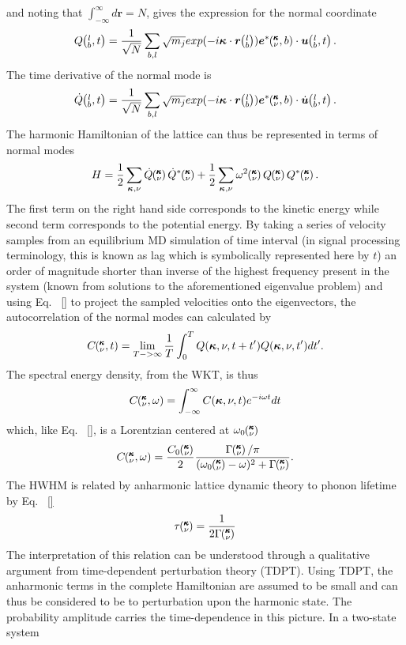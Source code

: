 %
and noting that $\int_{-\infty}^{\infty}d\bm{r}=N$, gives the expression for the normal coordinate
%
\begin{equation}
Q\lbt=\frac{1}{\sqrt{N}}\sum_{b,l}\sqrt{m_j}exp(-i\bm{\kappa}\cdot\bm{r}\lb)\bm{e}^*\kvb\cdot\bm{u}\lbt.
\end{equation}
%
The time derivative of the normal mode is
%
\begin{equation}
\dot{Q}\lbt=\frac{1}{\sqrt{N}}\sum_{b,l}\sqrt{m_j}exp(-i\bm{\kappa}\cdot\bm{r}\lb)\bm{e}^*\kvb\cdot\dot{\bm{u}}\lbt.
\end{equation}
%
The harmonic Hamiltonian of the lattice can thus be represented in terms of normal modes
%
\begin{equation}
H=\frac{1}{2}\sum_{\bm{\kappa},\nu}\dot{Q}\kv\dot{Q}^*\kv+\frac{1}{2}\sum_{\bm{\kappa},\nu}\omega^2\kv Q\kv Q^*\kv.
\end{equation}
%
The first term on the right hand side corresponds to the kinetic energy while second term corresponds to the potential energy. By taking a series of velocity samples from an equilibrium MD simulation of time interval (in signal processing terminology, this is known as lag which is symbolically represented here by $t$) an order of magnitude shorter than inverse of the highest frequency present in the system (known from solutions to the aforementioned eigenvalue problem) and using Eq. ~\ref{} to project the sampled velocities onto the eigenvectors, the autocorrelation of the normal modes can calculated by
%
\begin{equation}
C\mspace{-4.0mu}\left(\mspace{-8.0mu} \begin{smallmatrix}&\pmb{\kappa} \\&\nu\end{smallmatrix} \mspace{-2.0mu},t\right)=\lim_{T->\infty}\frac{1}{T}\int_{0}^{T}Q(\bm{\kappa},\nu,t+t')Q(\bm{\kappa},\nu,t')dt'.
\end{equation}
%
The spectral energy density, from the WKT, is thus
%
\begin{equation}
C\mspace{-4.0mu}\left(\mspace{-8.0mu} \begin{smallmatrix}&\pmb{\kappa} \\&\nu\end{smallmatrix} \mspace{-2.0mu},\omega\right)=\int_{-\infty}^{\infty}C(\bm{\kappa},\nu,t)e^{-i\omega t}dt
\end{equation}
%
which, like Eq. ~\ref{}, is a Lorentzian centered at $\omega_0\mspace{-4.0mu}\left(\mspace{-8.0mu} \begin{smallmatrix}&\pmb{\kappa} \\&\nu\end{smallmatrix} \mspace{-3.0mu}\right)$
%
\begin{equation}
C\kvw=\frac{C_0\kv}{2}\frac{\Gamma\kv/\pi}{(\omega_0\kv-\omega)^2+\Gamma\kv}.
\end{equation}
%
The HWHM is related by anharmonic lattice dynamic theory \cite{PhysRev.128.2589} to phonon lifetime by Eq. ~\ref{}
%
\begin{equation}
\tau \mspace{-4.0mu}\left(\mspace{-8.0mu} \begin{smallmatrix}&\pmb{\kappa} \\&\nu\end{smallmatrix} \mspace{-3.0mu}\right)=\frac{1}{2\Gamma\mspace{-4.0mu}\left(\mspace{-8.0mu} \begin{smallmatrix}&\pmb{\kappa} \\&\nu\end{smallmatrix} \mspace{-3.0mu}\right)}
\end{equation}
%
The interpretation of this relation can be understood through a qualitative argument from time-dependent perturbation theory (TDPT). Using TDPT, the anharmonic terms in the complete Hamiltonian are assumed to be small and can thus be considered to be to perturbation upon the harmonic state. The probability amplitude carries the time-dependence in this picture. In a two-state system
